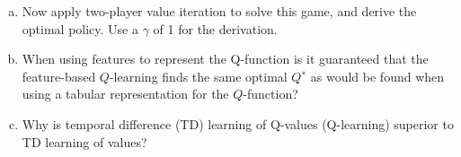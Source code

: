 \documentclass[a4paper]{article}
\begin{document}
\begin{enumerate}[(a)]
\vspace{15em}


\item Now apply two-player value iteration to solve this game, and derive the optimal policy. Use a $\gamma$ of 1 for the derivation.

\newpage

\item When using features to represent the Q-function is it guaranteed that the feature-based $Q$-learning finds the same optimal $Q^∗$ as would be found when using a tabular representation for the $Q$-function?

\vspace{8em}

\item Why is temporal difference (TD) learning of Q-values (Q-learning) superior to TD learning of values?

\vspace{8em}

\end{enumerate}
\end{document}
